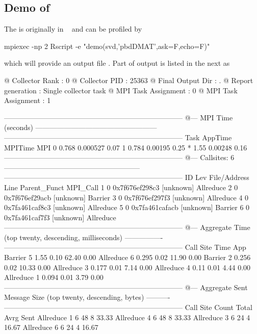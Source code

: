 \subsection{Demo of }

The  is originally in
~\citep{Schmidt2012pbdBASEpackage}
and can be profiled by
\begin{Code}
mpiexec -np 2 Rscript -e "demo(svd,'pbdDMAT',ask=F,echo=F)"
\end{Code}
which will provide an output file .
Part of output is listed in the next as
\begin{Output}
@ Collector Rank           : 0
@ Collector PID            : 25363
@ Final Output Dir         : .
@ Report generation        : Single collector task
@ MPI Task Assignment      : 0
@ MPI Task Assignment      : 1

---------------------------------------------------------------------------
@--- MPI Time (seconds) ---------------------------------------------------
---------------------------------------------------------------------------
Task   AppTime  MPITime     MPI%
0      0.768   0.000527     0.07
1      0.784    0.00195     0.25
*       1.55    0.00248     0.16
---------------------------------------------------------------------------
@--- Callsites: 6 ---------------------------------------------------------
---------------------------------------------------------------------------
ID Lev File/Address        Line Parent_Funct             MPI_Call
1   0 0x7f676ef298c3           [unknown]                Allreduce
2   0 0x7f676ef29acb           [unknown]                Barrier
3   0 0x7f676ef297f3           [unknown]                Allreduce
4   0 0x7fa461caf8c3           [unknown]                Allreduce
5   0 0x7fa461cafacb           [unknown]                Barrier
6   0 0x7fa461caf7f3           [unknown]                Allreduce
---------------------------------------------------------------------------
@--- Aggregate Time (top twenty, descending, milliseconds) ----------------
---------------------------------------------------------------------------
Call                 Site       Time    App%
Barrier                 5       1.55    0.10   62.40    0.00
Allreduce               6      0.295    0.02   11.90    0.00
Barrier                 2      0.256    0.02   10.33    0.00
Allreduce               3      0.177    0.01    7.14    0.00
Allreduce               4       0.11    0.01    4.44    0.00
Allreduce               1      0.094    0.01    3.79    0.00
---------------------------------------------------------------------------
@--- Aggregate Sent Message Size (top twenty, descending, bytes) ----------
---------------------------------------------------------------------------
Call                 Site      Count      Total       Avrg  Sent%
Allreduce               1          6         48          8  33.33
Allreduce               4          6         48          8  33.33
Allreduce               3          6         24          4  16.67
Allreduce               6          6         24          4  16.67
\end{Output}

